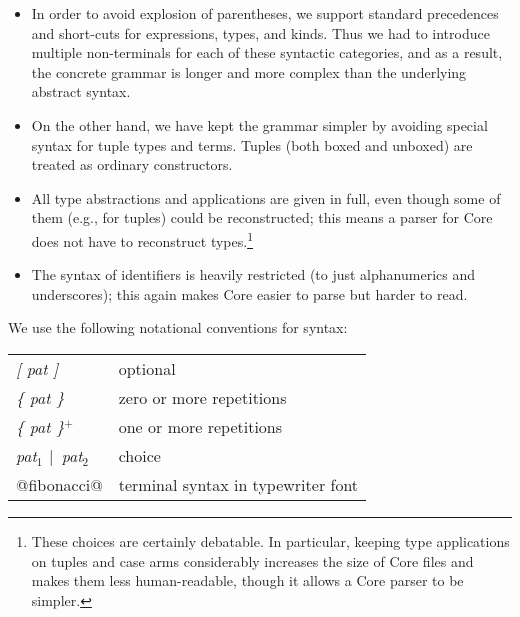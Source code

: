 \documentclass[10pt]{article}
\newcommand{\orderives}{\mbox{$\mid$}}
\begin{document}
\begin{itemize}
\item In order to avoid explosion of parentheses, we support standard precedences
and short-cuts for expressions, types, and kinds. Thus we had to introduce
multiple non-terminals for each of these syntactic categories, and as a result,
the concrete grammar is longer and more complex than the underlying abstract syntax.

\item On the other hand, we have kept the grammar simpler by avoiding special syntax for 
tuple types and terms. Tuples (both boxed and unboxed) are treated 
as ordinary constructors. 

\item All type abstractions and applications are given in full, even though
some of them (e.g., for tuples) could be reconstructed; this means a parser for Core does not have to
reconstruct types.\footnote{These choices are certainly debatable.  In particular, keeping 
type applications on tuples and case arms considerably increases the size of Core files and
makes them less human-readable, though it allows a Core parser to be simpler.}

\item The syntax of identifiers is heavily restricted (to just
alphanumerics and underscores); this again makes Core easier to parse but harder to read.

\end{itemize}

We use the following notational conventions for syntax:

\begin{tabular}{ll}
{\it [ pat ]} & optional \\
{\it \{ pat \}} & zero or more repetitions \\
{\it \{ pat \}$^{+}$} & one or more repetitions \\
{\it pat$_1$ \orderives\ pat$_2$} & choice \\
@fibonacci@ & terminal syntax in typewriter font \\
\end{tabular}

\newpage
\end{document}
